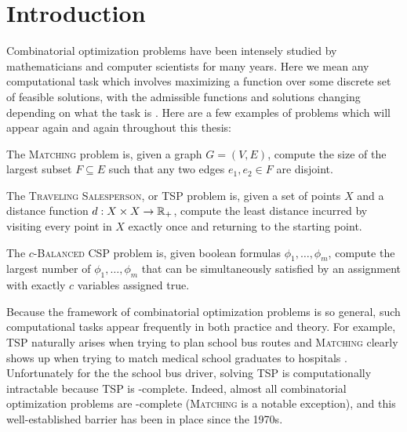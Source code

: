 \chapter{Introduction}\label{cha:introduction}

Combinatorial optimization problems have been intensely studied by mathematicians and computer scientists for many years.
Here  we mean any computational task which involves maximizing a function over some discrete set of feasible solutions, with the admissible functions and solutions changing depending on what the task is .
Here are a few examples of problems which will appear again and again throughout this thesis: 
\begin{example}
The \textsc{Matching} problem is, given a graph $G = (V,E)$, compute the size of the largest subset $F \subseteq E$ such that any two edges $e_1,e_2 \in F$ are disjoint.
\end{example}
\begin{example}
The \textsc{Traveling Salesperson}, or \textsc{TSP} problem is, given a set of points $X$ and a distance function $d: X \times X \rightarrow \mathbb R_+$, compute the least distance incurred by visiting every point in $X$ exactly once and returning to the starting point.
\end{example}
\begin{example}
The \textsc{$c$-Balanced CSP} problem is, given boolean formulas $\phi_1,\dots,\phi_m$, compute the largest number of $\phi_1,\dots,\phi_m$ that can be simultaneously satisfied by an assignment with exactly $c$ variables assigned true.
\end{example}

Because the framework of combinatorial optimization problems is so general, such computational tasks appear frequently in both practice and theory.
For example, \textsc{TSP} naturally arises when trying to plan school bus routes and \textsc{Matching} clearly shows up when trying to match medical school graduates to hospitals . Unfortunately for the the school bus driver, solving \textsc{TSP} is computationally intractable because \textsc{TSP} is \np-complete\cite{Karp1972}. Indeed, almost all combinatorial optimization problems are \np-complete  (\textsc{Matching} is a notable exception), and this well-established barrier has been in place since the 1970s.


